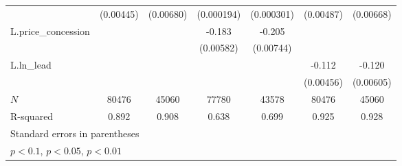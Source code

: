 {\begin{tabular}{l*{6}{c}}
            &   (0.00445)         &   (0.00680)         &  (0.000194)         &  (0.000301)         &   (0.00487)         &   (0.00668)         \\
\addlinespace
L.price\_concession&                     &                     &      -0.183\sym{***}&      -0.205\sym{***}&                     &                     \\
            &                     &                     &   (0.00582)         &   (0.00744)         &                     &                     \\
\addlinespace
L.ln\_lead   &                     &                     &                     &                     &      -0.112\sym{***}&      -0.120\sym{***}\\
            &                     &                     &                     &                     &   (0.00456)         &   (0.00605)         \\
\midrule
\(N\)       &       80476         &       45060         &       77780         &       43578         &       80476         &       45060         \\
R-squared   &       0.892         &       0.908         &       0.638         &       0.699         &       0.925         &       0.928         \\
\bottomrule
\multicolumn{7}{l}{\footnotesize Standard errors in parentheses}\\
\multicolumn{7}{l}{\footnotesize \sym{*} \(p<0.1\), \sym{**} \(p<0.05\), \sym{***} \(p<0.01\)}\\
\end{tabular}
}
